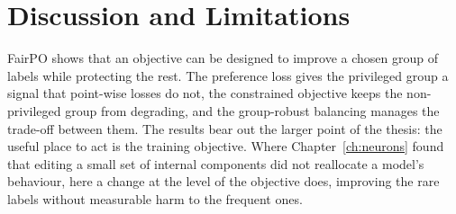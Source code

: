 \begin{table}[h]
	\caption{Ablation on the preference formulation (FairPO-CPO, MS-COCO).
		$\Delta\text{mAP}(\privileged)$ is measured against BCE-SFT. Parentheses show the
		change relative to the full FairPO-CPO model.}
	\label{tab:fairpo-ablation-pref}
	\centering
	\tiny
\end{table}

\section{Discussion and Limitations}
\label{sec:fairpo-discussion}

FairPO shows that an objective can be designed to improve a chosen group of labels
while protecting the rest. The preference loss gives the privileged group a signal
that point-wise losses do not, the constrained objective keeps the non-privileged
group from degrading, and the group-robust balancing manages the trade-off between
them. The results bear out the larger point of the thesis: the useful place to act
is the training objective. Where Chapter~\ref{ch:neurons} found that editing a
small set of internal components did not reallocate a model's behaviour, here a
change at the level of the objective does, improving the rare labels without
measurable harm to the frequent ones.


